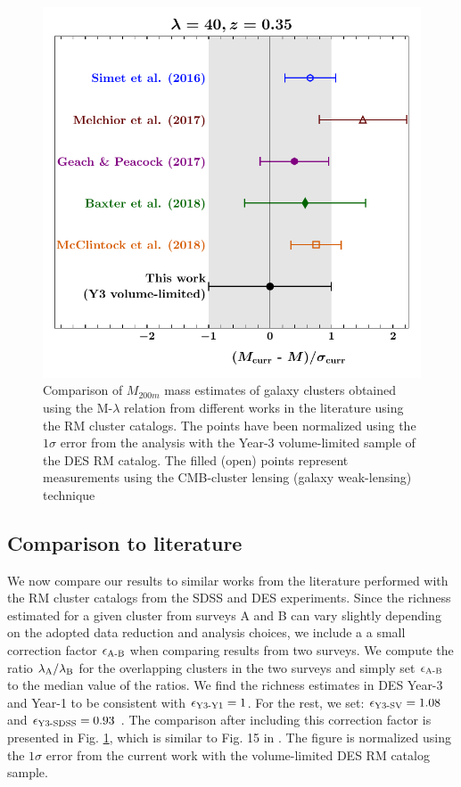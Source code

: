 \begin{figure}[ht]
\centering
\includegraphics{figs/lit_comparisons_JODY.pdf}
\caption{Comparison of $M_{200m}$ mass estimates of galaxy clusters obtained using the M-$\lambda$ relation from different works in the literature using the RM cluster catalogs. The points have been normalized using the $1\sigma$ error from the analysis with the Year-3 volume-limited sample of the DES RM catalog. The filled (open) points represent measurements using the CMB-cluster lensing (galaxy weak-lensing) technique}
\label{fig_lit_comparison}
\end{figure}
\subsection{Comparison to literature}\label{subsec_lit_comparison}
We now compare our results to similar works from the literature performed with the RM cluster catalogs from the SDSS and DES experiments. 
Since the richness estimated for a given cluster from surveys A and B can vary slightly depending on the adopted data reduction and analysis choices, we include a a small correction factor $\epsilon_{\rm A{\text -}B}$ when comparing results from two surveys.
We compute the ratio $\lambda_{\rm A}/\lambda_{\rm B}$ for the overlapping clusters in the two surveys and simply set $\epsilon_{\rm A{\text -}B}$ to the median value of the ratios.
We find the richness estimates in DES Year-3 and Year-1 to be consistent with $\epsilon_{\rm Y3{\text -}Y1} = 1$. 
For the rest, we set: $\epsilon_{\rm Y3{\text -}SV} = 1.08$ and $\epsilon_{\rm Y3{\text -}SDSS} = 0.93$ \cite{mcclintock18}.
The comparison after including this correction factor is presented in Fig. \ref{fig_lit_comparison}, which is similar to Fig. 15 in \cite{mcclintock18}. 
The figure is normalized using the $1\sigma$ error from the current work with the \whichyear{} volume-limited DES RM catalog sample.

